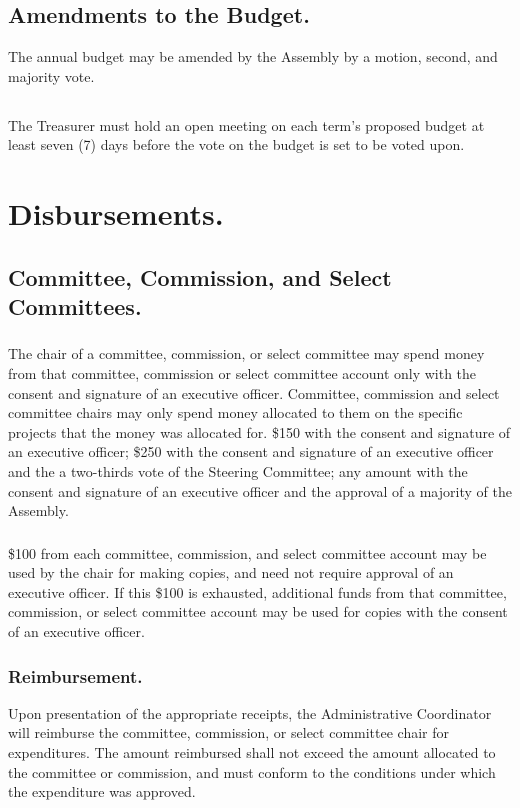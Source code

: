 \subsection{Amendments to the Budget.}
The annual budget may be amended by the Assembly by a motion, second, and majority vote.

\subsection{}
The Treasurer must hold an open meeting on each term's proposed budget at least seven (7) days before the vote on the budget is set to be voted upon.


\section{Disbursements.}

\subsection{Committee, Commission, and Select Committees.}
\subsubsection{}
The chair of a committee, commission, or select committee may spend money from that committee, commission or select committee account only with the consent and signature of an executive officer. Committee, commission and select committee chairs may only spend money allocated to them on the specific projects that the money was allocated for.
\subsubsubsection{}
\$150 with the consent and signature of an executive officer;
\subsubsubsection{}
\$250 with the consent and signature of an executive officer and the a two-thirds vote of the Steering Committee;
\subsubsubsection{}
any amount with the consent and signature of an executive officer and the approval of a majority of the Assembly.
\subsubsection{}
\$100 from each committee, commission, and select committee account may be used by the chair for making copies, and need not require approval of an executive officer.  If this \$100 is exhausted, additional funds from that committee, commission, or select committee account may be used for copies with the consent of an executive officer.
\subsubsection{Reimbursement.}
Upon presentation of the appropriate receipts, the Administrative Coordinator will reimburse the committee, commission, or select committee chair for expenditures.  The amount reimbursed shall not exceed the amount allocated to the committee or commission, and must conform to the conditions under which the expenditure was approved.
